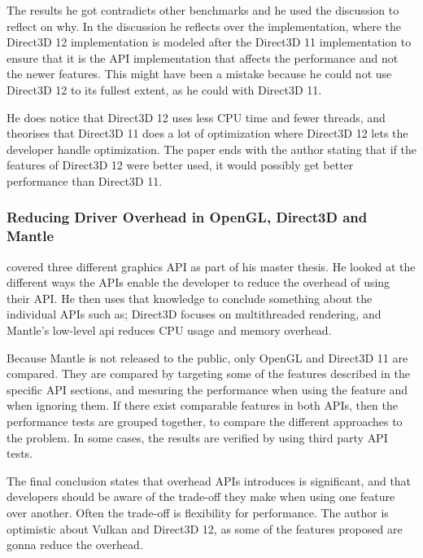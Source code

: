The results he got contradicts other benchmarks and he used the discussion to reflect on why.
In the discussion he reflects over the implementation, where the Direct3D 12 implementation is modeled after the Direct3D 11 implementation to ensure that it is the \gls{API} implementation that affects the performance and not the newer features.
This might have been a mistake because he could not use Direct3D 12 to its fullest extent, as he could with Direct3D 11.

He does notice that Direct3D 12 uses less \gls{CPU} time and fewer threads, and theorises that Direct3D 11 does a lot of optimization where Direct3D 12 lets the developer handle optimization.
The paper ends with the author stating that if the features of Direct3D 12 were better used, it would possibly get better performance than Direct3D 11. 

\subsubsection{Reducing Driver Overhead in OpenGL, Direct3D and Mantle}

\citet{dobersberger_2015_reducing} covered three different graphics \gls{API} as part of his master thesis. 
He looked at the different ways the \glspl{API} enable the developer to reduce the overhead of using their \gls{API}. 
He then uses that knowledge to conclude something about the individual \glspl{API} such as; Direct3D focuses on multithreaded rendering, and Mantle's low-level api reduces \gls{CPU} usage and memory overhead.

Because Mantle is not released to the public, only OpenGL and Direct3D 11 are compared.
They are compared by targeting some of the features described in the specific \gls{API} sections, and mesuring the performance when using the feature and when ignoring them.
If there exist comparable features in both \glspl{API}, then the performance tests are grouped together, to compare the different approaches to the problem.
In some cases, the results are verified by using third party \gls{API} tests.

The final conclusion states that overhead \glspl{API} introduces is significant, and that developers should be aware of the trade-off they make when using one feature over another.
Often the trade-off is flexibility for performance.
The author is optimistic about Vulkan and Direct3D 12, as some of the features proposed are gonna reduce the overhead.

